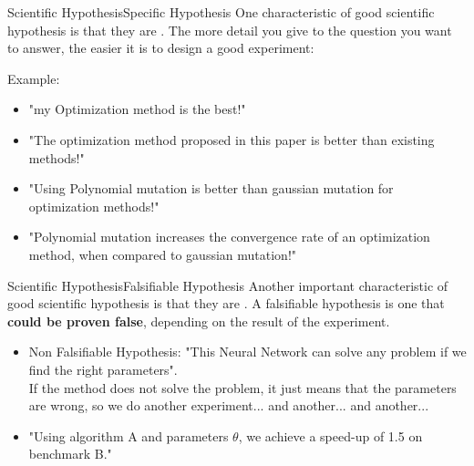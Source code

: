 \begin{frame}{Scientific Hypothesis}{Specific Hypothesis}
  One characteristic of good scientific hypothesis is that they are . The more detail you give to the question you want to answer, the easier it is to design a good experiment:\bigskip

  Example:
  \begin{itemize}
    \item "my Optimization method is the best!"
    \item "The optimization method proposed in this paper is better than existing methods!"
    \item "Using Polynomial mutation is better than gaussian mutation for optimization methods!"
    \item "Polynomial mutation increases the convergence rate of an optimization method, when compared to gaussian mutation!"
  \end{itemize}
\end{frame}

\begin{frame}{Scientific Hypothesis}{Falsifiable Hypothesis}
  Another important characteristic of good scientific hypothesis is that they are . A falsifiable hypothesis is one that {\bf could be proven false}, depending on the result of the experiment.\bigskip


  \begin{itemize}
    \item \alert{Non Falsifiable Hypothesis:} "This Neural Network can solve any problem if we find the right parameters".\\
    {\smaller
    If the method does not solve the problem, it just means that the parameters are wrong, so we do another experiment... and another... and another...}\bigskip

    \item {} "Using algorithm A and parameters $\theta$, we achieve a speed-up of 1.5 on benchmark B."
  \end{itemize}\bigskip
\end{frame}

